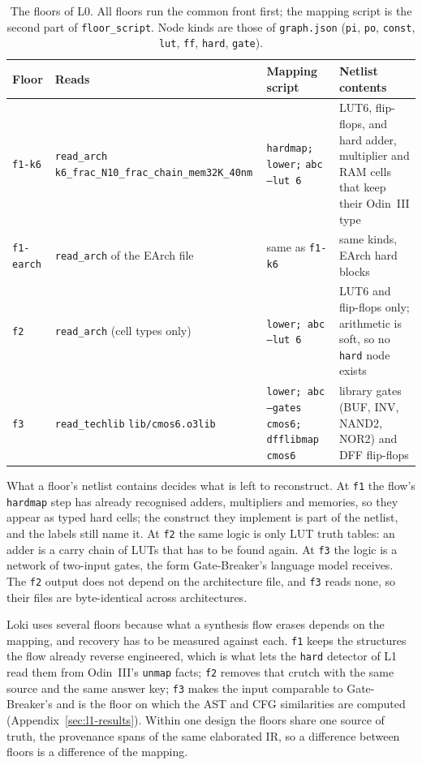 \documentclass[conference]{IEEEtran}
\newcommand{\code}[1]{\texttt{#1}}
\begin{document}
\begin{table}[t]
\caption{The floors of L0. All floors run the common front first; the mapping script is the
second part of \code{floor\_script}. Node kinds are those of \code{graph.json}
(\code{pi}, \code{po}, \code{const}, \code{lut}, \code{ff}, \code{hard}, \code{gate}).}
\label{tab:floors}
\centering
\footnotesize
\begin{tabular}{@{}lp{4.2cm}p{4.7cm}p{6.5cm}@{}}
\toprule
Floor & Reads & Mapping script & Netlist contents \\
\midrule
\code{f1-k6} & \code{read\_arch} \code{k6\_frac\_N10\_}\allowbreak\code{frac\_chain\_}\allowbreak\code{mem32K\_40nm} &
 \code{hardmap; lower;} \code{abc --lut 6} & LUT6, flip-flops, and hard adder, multiplier and RAM
 cells that keep their Odin~III type \\
\code{f1-earch} & \code{read\_arch} of the EArch file & same as \code{f1-k6} & same kinds, EArch hard blocks \\
\code{f2} & \code{read\_arch} (cell types only) & \code{lower; abc --lut 6} &
 LUT6 and flip-flops only; arithmetic is soft, so no \code{hard} node exists \\
\code{f3} & \code{read\_techlib} \code{lib/cmos6.o3lib} & \code{lower; abc --gates cmos6;} \code{dfflibmap cmos6} &
 library gates (BUF, INV, NAND2, NOR2) and DFF flip-flops \\
\bottomrule
\end{tabular}
\end{table}

What a floor's netlist contains decides what is left to reconstruct. At \code{f1} the
flow's \code{hardmap} step has already recognised adders, multipliers and memories, so they
appear as typed hard cells; the construct they implement is part of the netlist, and the
labels still name it. At \code{f2} the same logic is only LUT truth tables: an adder is a
carry chain of LUTs that has to be found again. At \code{f3} the logic is a network of
two-input gates, the form Gate-Breaker's language model receives. The \code{f2} output does
not depend on the architecture file, and \code{f3} reads none, so their files are
byte-identical across architectures.

Loki uses several floors because what a synthesis flow erases depends on the mapping, and
recovery has to be measured against each. \code{f1} keeps the structures the flow already
reverse engineered, which is what lets the \code{hard} detector of L1 read them from
Odin~III's \code{unmap} facts; \code{f2} removes that crutch with the same source and the
same answer key; \code{f3} makes the input comparable to Gate-Breaker's and is the floor on
which the AST and CFG similarities are computed (Appendix~\ref{sec:l1-results}). Within one
design the floors share one source of truth, the provenance spans of the same elaborated
IR, so a difference between floors is a difference of the mapping.
\end{document}
